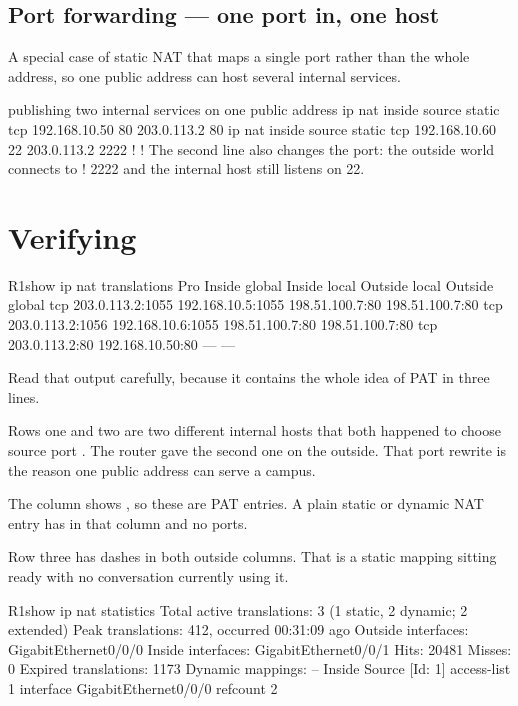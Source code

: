 \subsection{Port forwarding --- one port in, one host}

A special case of static NAT that maps a single port rather than the whole
address, so one public address can host several internal services.

\begin{config}{publishing two internal services on one public address}
ip nat inside source static tcp 192.168.10.50 80  203.0.113.2 80
ip nat inside source static tcp 192.168.10.60 22  203.0.113.2 2222
!
! The second line also changes the port: the outside world connects to
! 2222 and the internal host still listens on 22.
\end{config}

\section{Verifying}

\begin{verify}{R1}{show ip nat translations}
Pro  Inside global        Inside local         Outside local        Outside global
tcp  203.0.113.2:1055     192.168.10.5:1055    198.51.100.7:80      198.51.100.7:80
tcp  203.0.113.2:1056     192.168.10.6:1055    198.51.100.7:80      198.51.100.7:80
tcp  203.0.113.2:80       192.168.10.50:80     ---                  ---
\end{verify}

Read that output carefully, because it contains the whole idea of PAT in three
lines.

\begin{tight}
  \item Rows one and two are two different internal hosts that both happened to
        choose source port . The router gave the second one 
        on the outside. That port rewrite is the reason one public address can
        serve a campus.
  \item The  column shows , so these are PAT entries. A plain
        static or dynamic NAT entry has \cmd{---} in that column and no ports.
  \item Row three has dashes in both outside columns. That is a static mapping
        sitting ready with no conversation currently using it.
\end{tight}

\begin{verify}{R1}{show ip nat statistics}
Total active translations: 3 (1 static, 2 dynamic; 2 extended)
Peak translations: 412, occurred 00:31:09 ago
Outside interfaces:
  GigabitEthernet0/0/0
Inside interfaces:
  GigabitEthernet0/0/1
Hits: 20481  Misses: 0
Expired translations: 1173
Dynamic mappings:
-- Inside Source
[Id: 1] access-list 1 interface GigabitEthernet0/0/0 refcount 2
\end{verify}

